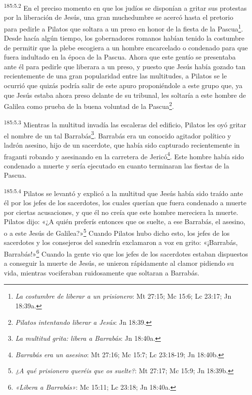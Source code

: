 \par 
\textsuperscript{185:5.2} En el preciso momento en que los judíos se disponían a gritar sus protestas por la liberación de Jesús, una gran muchedumbre se acercó hasta el pretorio para pedirle a Pilatos que soltara a un preso en honor de la fiesta de la Pascua\footnote{\textit{La costumbre de liberar a un prisionero}: Mt 27:15; Mc 15:6; Lc 23:17; Jn 18:39a.}. Desde hacía algún tiempo, los gobernadores romanos habían tenido la costumbre de permitir que la plebe escogiera a un hombre encarcelado o condenado para que fuera indultado en la época de la Pascua. Ahora que este gentío se presentaba ante él para pedirle que liberara a un preso, y puesto que Jesús había gozado tan recientemente de una gran popularidad entre las multitudes, a Pilatos se le ocurrió que quizás podría salir de este apuro proponiéndole a este grupo que, ya que Jesús estaba ahora preso delante de su tribunal, les soltaría a este hombre de Galilea como prueba de la buena voluntad de la Pascua\footnote{\textit{Pilatos intentando liberar a Jesús}: Jn 18:39.}.

\par 
\textsuperscript{185:5.3} Mientras la multitud invadía las escaleras del edificio, Pilatos les oyó gritar el nombre de un tal Barrabás\footnote{\textit{La multitud grita: libera a Barrabás}: Jn 18:40a.}. Barrabás era un conocido agitador político y ladrón asesino, hijo de un sacerdote, que había sido capturado recientemente in fraganti robando y asesinando en la carretera de Jericó\footnote{\textit{Barrabás era un asesino}: Mt 27:16; Mc 15:7; Lc 23:18-19; Jn 18:40b.}. Este hombre había sido condenado a muerte y sería ejecutado en cuanto terminaran las fiestas de la Pascua.

\par 
\textsuperscript{185:5.4} Pilatos se levantó y explicó a la multitud que Jesús había sido traído ante él por los jefes de los sacerdotes, los cuales querían que fuera condenado a muerte por ciertas acusaciones, y que él no creía que este hombre mereciera la muerte. Pilatos dijo: «¿A quién preferís entonces que os suelte, a ese Barrabás, el asesino, o a este Jesús de Galilea?»\footnote{\textit{¿A qué prisionero queréis que os suelte?}: Mt 27:17; Mc 15:9; Jn 18:39b.} Cuando Pilatos hubo dicho esto, los jefes de los sacerdotes y los consejeros del sanedrín exclamaron a voz en grito: «¡Barrabás, Barrabás!»\footnote{\textit{«Libera a Barrabás»}: Mc 15:11; Lc 23:18; Jn 18:40a.} Cuando la gente vio que los jefes de los sacerdotes estaban dispuestos a conseguir la muerte de Jesús, se unieron rápidamente al clamor pidiendo su vida, mientras vociferaban ruidosamente que soltaran a Barrabás.

